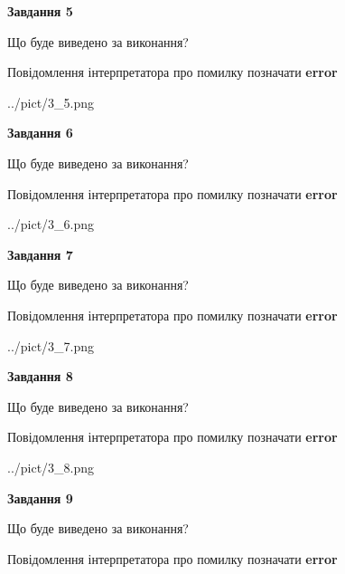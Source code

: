 \documentclass[11pt, ukrainian]{article}
\begin{document}
{\begin {large}
{\begin {center}\textbf{Завдання 5}\end {center}}\par
Що буде виведено за виконання? \par
Повідомлення інтерпретатора про помилку позначати \textbf{error}

\begin{center}
	{../pict/3_5.png}
\end{center}
\newpage

{\begin {center}\textbf{Завдання 6}\end {center}}\par
Що буде виведено за виконання? \par
Повідомлення інтерпретатора про помилку позначати \textbf{error}

\begin{center}
	{../pict/3_6.png}
\end{center}
\newpage

{\begin {center}\textbf{Завдання 7}\end {center}}\par
Що буде виведено за виконання? \par
Повідомлення інтерпретатора про помилку позначати \textbf{error}

\begin{center}
	{../pict/3_7.png}
\end{center}
\newpage

{\begin {center}\textbf{Завдання 8}\end {center}}\par
Що буде виведено за виконання? \par
Повідомлення інтерпретатора про помилку позначати \textbf{error}

\begin{center}
	{../pict/3_8.png}
\end{center}
\newpage

{\begin {center}\textbf{Завдання 9}\end {center}}\par
Що буде виведено за виконання? \par
Повідомлення інтерпретатора про помилку позначати \textbf{error}


\end{large}}
\end{document}
